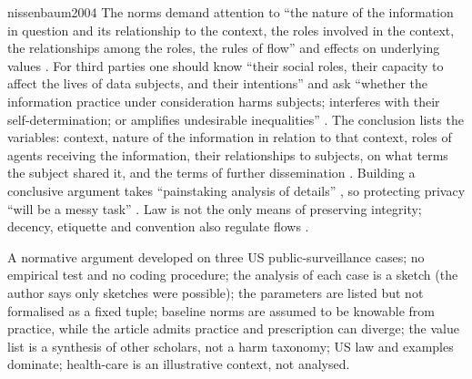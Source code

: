 \begin{papercard}{nissenbaum2004}
 The norms demand attention to ``the nature of the information in question and its relationship to the context, the roles involved in the context, the relationships among the roles, the rules of flow'' and effects on underlying values . For third parties one should know ``their social roles, their capacity to affect the lives of data subjects, and their intentions'' and ask ``whether the information practice under consideration harms subjects; interferes with their self-determination; or amplifies undesirable inequalities'' . The conclusion lists the variables: context, nature of the information in relation to that context, roles of agents receiving the information, their relationships to subjects, on what terms the subject shared it, and the terms of further dissemination . Building a conclusive argument takes ``painstaking analysis of details'' , so protecting privacy ``will be a messy task'' . Law is not the only means of preserving integrity; decency, etiquette and convention also regulate flows .

 A normative argument developed on three US public-surveillance cases; no empirical test and no coding procedure; the analysis of each case is a sketch (the author says only sketches were possible); the parameters are listed but not formalised as a fixed tuple; baseline norms are assumed to be knowable from practice, while the article admits practice and prescription can diverge; the value list is a synthesis of other scholars, not a harm taxonomy; US law and examples dominate; health-care is an illustrative context, not analysed.


\end{papercard}
